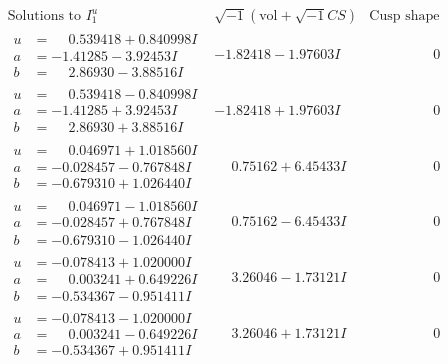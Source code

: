 \documentclass[1p]{elsarticle_modified}
\theoremstyle{definition}
\newcommand{\I}{\sqrt{-1}}
\begin{document}
$$\begin{array}{c|c|c}  
\text{Solutions to }I^u_{1}& \I (\text{vol} + \sqrt{-1}CS) & \text{Cusp shape}\\
 \hline 
\begin{aligned}
u &= \phantom{-}0.539418 + 0.840998 I \\
a &= -1.41285 - 3.92453 I \\
b &= \phantom{-}2.86930 - 3.88516 I\end{aligned}
 & -1.82418 - 1.97603 I & \phantom{-0.000000 } 0 \\ \hline\begin{aligned}
u &= \phantom{-}0.539418 - 0.840998 I \\
a &= -1.41285 + 3.92453 I \\
b &= \phantom{-}2.86930 + 3.88516 I\end{aligned}
 & -1.82418 + 1.97603 I & \phantom{-0.000000 } 0 \\ \hline\begin{aligned}
u &= \phantom{-}0.046971 + 1.018560 I \\
a &= -0.028457 - 0.767848 I \\
b &= -0.679310 + 1.026440 I\end{aligned}
 & \phantom{-}0.75162 + 6.45433 I & \phantom{-0.000000 } 0 \\ \hline\begin{aligned}
u &= \phantom{-}0.046971 - 1.018560 I \\
a &= -0.028457 + 0.767848 I \\
b &= -0.679310 - 1.026440 I\end{aligned}
 & \phantom{-}0.75162 - 6.45433 I & \phantom{-0.000000 } 0 \\ \hline\begin{aligned}
u &= -0.078413 + 1.020000 I \\
a &= \phantom{-}0.003241 + 0.649226 I \\
b &= -0.534367 - 0.951411 I\end{aligned}
 & \phantom{-}3.26046 - 1.73121 I & \phantom{-0.000000 } 0 \\ \hline\begin{aligned}
u &= -0.078413 - 1.020000 I \\
a &= \phantom{-}0.003241 - 0.649226 I \\
b &= -0.534367 + 0.951411 I\end{aligned}
 & \phantom{-}3.26046 + 1.73121 I & \phantom{-0.000000 } 0 \\ \hline\begin{aligned}

\end{aligned}
\end{array}$$
\end{document}
